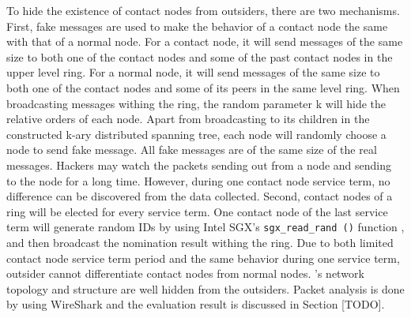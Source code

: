 To hide the existence of \xxx contact nodes from outsiders, there are two mechanisms. First, fake messages are used to make the behavior of a contact node the same with that of a normal node. For a contact node, it will send messages of the same size to both one of the contact nodes and some of the past contact nodes in the upper level ring. For a normal node, it will send messages of the same size to both one of the contact nodes and some of its peers in the same level ring. When broadcasting messages withing the ring, the random parameter k will hide the relative orders of each node. Apart from broadcasting to its children in the constructed k-ary distributed spanning tree, each node will randomly choose a node to send fake message. All fake messages are of the same size of the real messages. Hackers may watch the packets sending out from a node and sending to the node for a long time. However, during one contact node service term, no difference can be discovered from the data collected. Second, contact nodes of a ring will be elected for every service term. One contact node of the last service term will generate random IDs by using Intel SGX's \texttt{sgx\_read\_rand ()} function \cite{costan2016intel}, and then broadcast the nomination result withing the ring. Due to both limited contact node service term period and the same behavior during one service term, outsider cannot differentiate contact nodes from normal nodes. \xxx's network topology and structure are well hidden from the outsiders. Packet analysis is done by using WireShark and the evaluation result is discussed in Section [TODO].